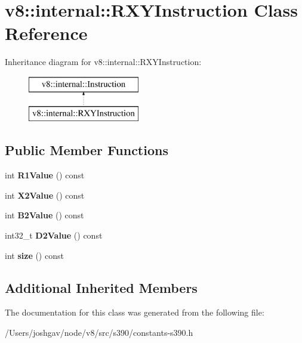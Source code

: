 \hypertarget{classv8_1_1internal_1_1_r_x_y_instruction}{}\section{v8\+:\+:internal\+:\+:R\+X\+Y\+Instruction Class Reference}
\label{classv8_1_1internal_1_1_r_x_y_instruction}
Inheritance diagram for v8\+:\+:internal\+:\+:R\+X\+Y\+Instruction\+:\begin{figure}[H]
\begin{center}
\leavevmode
\includegraphics[height=2.000000cm]{classv8_1_1internal_1_1_r_x_y_instruction}
\end{center}
\end{figure}
\subsection*{Public Member Functions}
\begin{DoxyCompactItemize}
\item 
int {\bfseries R1\+Value} () const \hypertarget{classv8_1_1internal_1_1_r_x_y_instruction_ad10aca296cd85139218969c485304c77}{}\label{classv8_1_1internal_1_1_r_x_y_instruction_ad10aca296cd85139218969c485304c77}

\item 
int {\bfseries X2\+Value} () const \hypertarget{classv8_1_1internal_1_1_r_x_y_instruction_a4dfc3641926c0d70faa153ee63b3e875}{}\label{classv8_1_1internal_1_1_r_x_y_instruction_a4dfc3641926c0d70faa153ee63b3e875}

\item 
int {\bfseries B2\+Value} () const \hypertarget{classv8_1_1internal_1_1_r_x_y_instruction_aa90e0214e5a0e36c395d62dea5ab5371}{}\label{classv8_1_1internal_1_1_r_x_y_instruction_aa90e0214e5a0e36c395d62dea5ab5371}

\item 
int32\+\_\+t {\bfseries D2\+Value} () const \hypertarget{classv8_1_1internal_1_1_r_x_y_instruction_a95ca3eaf70eac0d3b4179b7f764dad5e}{}\label{classv8_1_1internal_1_1_r_x_y_instruction_a95ca3eaf70eac0d3b4179b7f764dad5e}

\item 
int {\bfseries size} () const \hypertarget{classv8_1_1internal_1_1_r_x_y_instruction_a2e08677d062db0ec53857b5f3c58193c}{}\label{classv8_1_1internal_1_1_r_x_y_instruction_a2e08677d062db0ec53857b5f3c58193c}

\end{DoxyCompactItemize}
\subsection*{Additional Inherited Members}


The documentation for this class was generated from the following file\+:\begin{DoxyCompactItemize}
\item 
/\+Users/joshgav/node/v8/src/s390/constants-\/s390.\+h\end{DoxyCompactItemize}
